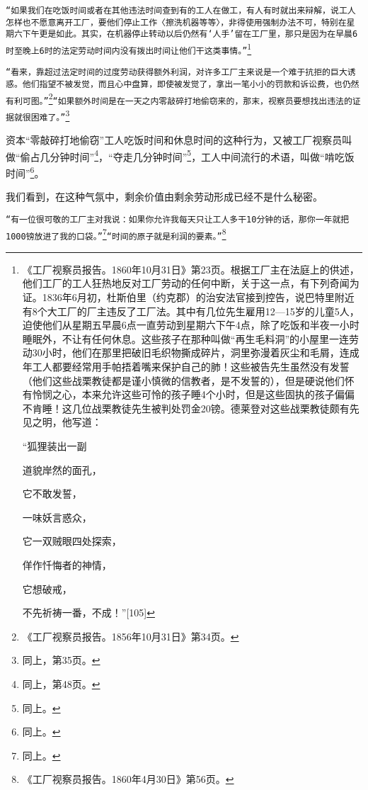 \documentclass{ctexbook}
\begin{document}
    \texttt{“如果我们在吃饭时间或者在其他违法时间查到有的工人在做工，有人有时就出来辩解，说工人怎样也不愿意离开工厂，要他们停止工作〈擦洗机器等等〉，非得使用强制办法不可，特别在星期六下午更是如此。其实，在机器停止转动以后仍然有‘人手’留在工厂里，那只是因为在早晨6时至晚上6时的法定劳动时间内没有拨出时间让他们干这类事情。”}\footnote{《工厂视察员报告。1860年10月31日》第23页。根据工厂主在法庭上的供述，他们工厂的工人狂热地反对工厂劳动的任何中断，关于这一点，有下列奇闻为证。1836年6月初，杜斯伯里（约克郡）的治安法官接到控告，说巴特里附近有8个大工厂的厂主违反了工厂法。其中有几位先生雇用12—15岁的儿童5人，迫使他们从星期五早晨6点一直劳动到星期六下午4点，除了吃饭和半夜一小时睡眠外，不让有任何休息。这些孩子在那种叫做“再生毛料洞”的小屋里一连劳动30小时，他们在那里把破旧毛织物撕成碎片，洞里弥漫着灰尘和毛屑，连成年工人都要经常用手帕捂着嘴来保护自己的肺！这些被告先生虽然没有发誓（他们这些战栗教徒都是谨小慎微的信教者，是不发誓的），但是硬说他们怀有怜悯之心，本来允许这些可怜的孩子睡4个小时，但是这些固执的孩子偏偏不肯睡！这几位战栗教徒先生被判处罚金20镑。德莱登对这些战栗教徒颇有先见之明，他写道：

    “狐狸装出一副

    道貌岸然的面孔，

    它不敢发誓，

    一味妖言惑众，

    它一双贼眼四处探索，

    佯作忏悔者的神情，

    它想破戒，

    不先祈祷一番，不成！”[105]}

    \texttt{“看来，靠超过法定时间的过度劳动获得额外利润，对许多工厂主来说是一个难于抗拒的巨大诱惑。他们指望不被发觉，而且心中盘算，即使被发觉了，拿出一笔小小的罚款和诉讼费，也仍然有利可图。”}\footnote{《工厂视察员报告。1856年10月31日》第34页。}\texttt{“如果额外时间是在一天之内零敲碎打地偷窃来的，那末，视察员要想找出违法的证据就很困难了。”}\footnote{同上，第35页。}

    资本“零敲碎打地偷窃”工人吃饭时间和休息时间的这种行为，又被工厂视察员叫做“偷占几分钟时间”\footnote{同上，第48页。}，“夺走几分钟时间”\footnote{同上。}，工人中间流行的术语，叫做“啃吃饭时间”\footnote{同上。}。

    我们看到，在这种气氛中，剩余价值由剩余劳动形成已经不是什么秘密。

    \texttt{“有一位很可敬的工厂主对我说：如果你允许我每天只让工人多干10分钟的话，那你一年就把1000镑放进了我的口袋。”}\footnote{同上。}\texttt{“时间的原子就是利润的要素。”}\footnote{《工厂视察员报告。1860年4月30日》第56页。}
\end{document}
